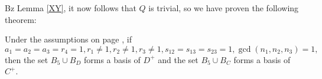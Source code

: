 Bz Lemma \ref{XY}, it now follows that $Q$ is trivial, so we have proven the following theorem:
\begin{theorem}
Under the assumptions on page \pageref{assum}, if $$a_1=a_2=a_3=r_4=1, r_1\neq 1, r_2\neq 1, r_3 \neq 1,s_{12}=s_{13}=s_{23}=1,\gcd(n_1,n_2,n_3)=1,$$ then  the set $B_{5}\cup B_D$ forms a basis of $D^+$ and the set $B_{5}\cup B_C$ forms a basis of $C^+$.
\end{theorem}
